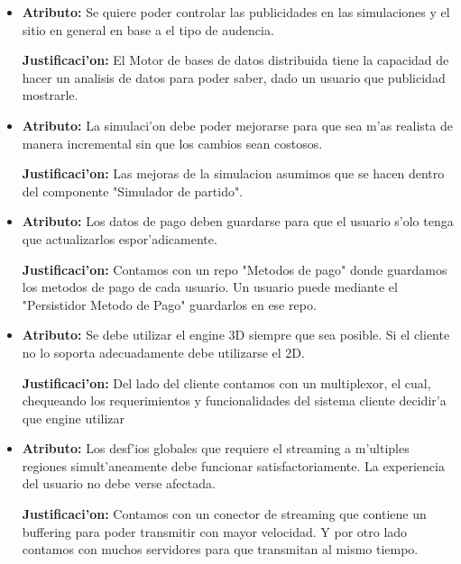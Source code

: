\begin{itemize}


\item \textbf{Atributo:} Se quiere poder controlar las publicidades en las simulaciones y el sitio en general en base a el tipo de audencia.

 \textbf{Justificaci'on:} El Motor de bases de datos distribuida tiene la capacidad de hacer un analisis de datos para poder saber, dado un usuario que publicidad mostrarle.

\item \textbf{Atributo:} La simulaci'on debe poder mejorarse para que sea m'as realista de manera incremental sin que los cambios sean costosos.

 \textbf{Justificaci'on:} Las mejoras de la simulacion asumimos que se hacen dentro del componente "Simulador de partido".

\item \textbf{Atributo:} Los datos de pago deben guardarse para que el usuario s'olo tenga que actualizarlos espor'adicamente.

 \textbf{Justificaci'on:} Contamos con un repo "Metodos de pago" donde guardamos los metodos de pago de cada usuario. Un usuario puede mediante el "Persistidor Metodo de Pago" guardarlos en ese repo.

\item \textbf{Atributo:} Se debe utilizar el engine 3D siempre que sea posible. Si el cliente no lo soporta adecuadamente debe utilizarse el 2D.

 \textbf{Justificaci'on:} Del lado del cliente contamos con un multiplexor, el cual, chequeando los requerimientos y funcionalidades del sistema cliente decidir'a que engine utilizar

\item \textbf{Atributo:} Los desf'ios globales que requiere el streaming a m'ultiples regiones simult'aneamente debe funcionar satisfactoriamente. La experiencia del usuario no debe verse afectada.

 \textbf{Justificaci'on:} Contamos con un conector de streaming que contiene un buffering para poder transmitir con mayor velocidad. Y por otro lado contamos con muchos servidores para que transmitan al mismo tiempo. 


\end{itemize}
